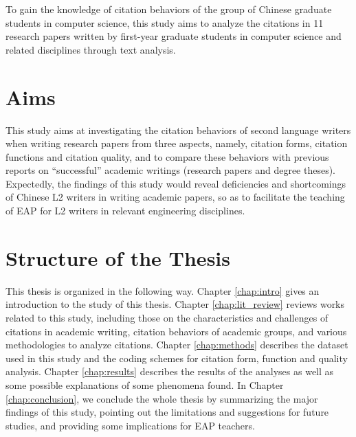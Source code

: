 To gain the knowledge of citation behaviors of the group of Chinese graduate students in computer science, this study aims to analyze the citations in 11 research papers written by first-year graduate students in computer science and related disciplines through text analysis.

\section{Aims}
This study aims at investigating the citation behaviors of second language writers when writing research papers from three aspects, namely, citation forms, citation functions and citation quality, and to compare these behaviors with previous reports on “successful” academic writings (research papers and degree theses). Expectedly, the findings of this study would reveal deficiencies and shortcomings of Chinese L2 writers in writing academic papers, so as to facilitate the teaching of EAP for L2 writers in relevant engineering disciplines.

\section{Structure of the Thesis}
This thesis is organized in the following way. Chapter \ref{chap:intro} gives an introduction to the study of this thesis. Chapter \ref{chap:lit_review} reviews works related to this study, including those on the characteristics and challenges of citations in academic writing, citation behaviors of academic groups, and various methodologies to analyze citations. Chapter \ref{chap:methods} describes the dataset used in this study and the coding schemes for citation form, function and quality analysis. Chapter \ref{chap:results} describes the results of the analyses as well as some possible explanations of some phenomena found. In Chapter \ref{chap:conclusion}, we conclude the whole thesis by summarizing the major findings of this study, pointing out the limitations and suggestions for future studies, and providing some implications for EAP teachers.